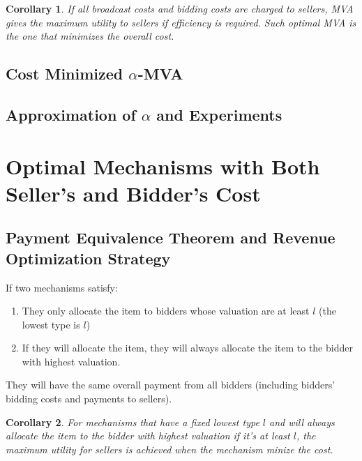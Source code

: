 \documentclass{aamas2012}
\begin{document}
\newtheorem{corollary}{Corollary}
\begin{corollary}
If all broadcast costs and bidding costs are charged to sellers,
MVA gives the maximum utility to sellers if efficiency is required.
Such optimal MVA is the one that minimizes the overall cost.
\end{corollary}

\subsection{Cost Minimized $\alpha$-MVA}

\subsection{Approximation of $\alpha$ and Experiments}

\section{Optimal Mechanisms with Both Seller's and Bidder's Cost}

\subsection{Payment Equivalence Theorem and Revenue Optimization Strategy}

\begin{theorem}
If two mechanisms satisfy:
\begin{enumerate}
\item They only allocate the item to bidders whose valuation
are at least $l$ (the lowest type is $l$)
\item If they will allocate the item, they
will always allocate the item to the bidder with highest valuation.
\end{enumerate}
They will have the same overall payment from all bidders 
(including bidders' bidding costs and payments to sellers).
\end{theorem}

\begin{corollary}
For mechanisms that have a fixed lowest type $l$ and
will always allocate the item to the bidder with highest valuation if it's at least $l$, 
the maximum utility for sellers is achieved
when the mechanism minize the cost.
\end{corollary}
\end{document}
